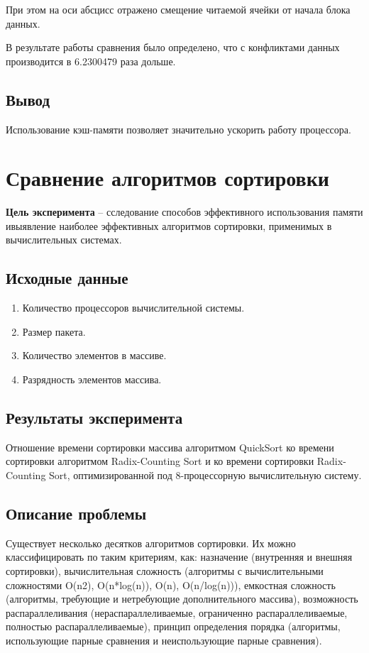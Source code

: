При этом на оси абсцисс отражено смещение читаемой ячейки от начала блока данных.



\clearpage


В результате работы сравнения было определено, что с конфликтами данных производится в 6.2300479 раза дольше.



\subsection{Вывод}

Использование кэш-памяти позволяет значительно ускорить работу процессора.




\section{Сравнение алгоритмов сортировки}

\textbf{Цель эксперимента} -- сследование способов эффективного использования  памяти ивыявление наиболее эффективных алгоритмов сортировки, применимых в вычислительных системах.

\subsection{Исходные данные}
\begin{enumerate}
	\item Количество процессоров вычислительной системы.
	\item Размер пакета.
	\item Количество элементов в массиве.
	\item Разрядность элементов массива.
\end{enumerate}

\subsection{Результаты эксперимента}
Отношение времени сортировки массива алгоритмом QuickSort ко времени сортировки алгоритмом Radix-Counting Sort  и ко времени сортировки Radix-Counting Sort, оптимизированной под 8-процессорную вычислительную систему.


\subsection{Описание проблемы}
Существует несколько десятков алгоритмов сортировки. Их можно классифицировать по таким критериям, как: назначение (внутренняя и внешняя сортировки), вычислительная сложность (алгоритмы с вычислительными сложностями O(n2), O(n*log(n)), O(n), O(n/log(n))), емкостная сложность (алгоритмы, требующие и нетребующие   дополнительного   массива),   возможность   распараллеливания   (нераспараллеливаемые, ограниченно распараллеливаемые, полностью распараллеливаемые), принцип   определения   порядка   (алгоритмы,   использующие   парные   сравнения   и   неиспользующие парные сравнения).

